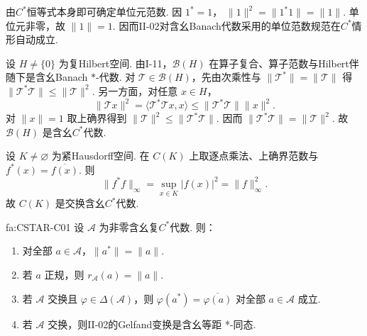 由\(\displaystyle C^*\)恒等式本身即可确定单位元范数. 因 \(\displaystyle1^*=1\)，
\(\displaystyle \|1\|^2=\|1^*1\|=\|1\|.\)
单位元非零，故 \(\displaystyle\|1\|=1\). 因而II-02对含幺Banach代数采用的单位范数规范在\(\displaystyle C^*\)情形自动成立.

\begin{FAExample}\label{ii03:bh-cstar}
设 \(\displaystyle H\neq\{0\}\) 为复Hilbert空间. 由I-11，\(\displaystyle\mathcal B(H)\) 在算子复合、算子范数与Hilbert伴随下是含幺Banach \(\displaystyle *\)-代数. 对 \(\displaystyle\mathcal T\in\mathcal B(H)\)，先由次乘性与 \(\displaystyle\|\mathcal T^*\|=\|\mathcal T\|\) 得
\(\displaystyle \|\mathcal T^*\mathcal T\|\leqslant\|\mathcal T\|^2.\)
另一方面，对任意 \(\displaystyle x\in H\)，
\[
\|\mathcal T x\|^2
=\langle\mathcal T^*\mathcal T x,x\rangle
\leqslant\|\mathcal T^*\mathcal T\|\|x\|^2.
\]
对 \(\displaystyle\|x\|=1\) 取上确界得到 \(\displaystyle\|\mathcal T\|^2\leqslant\|\mathcal T^*\mathcal T\|\). 因而
\(\displaystyle \|\mathcal T^*\mathcal T\|=\|\mathcal T\|^2.\)
故 \(\displaystyle\mathcal B(H)\) 是含幺\(\displaystyle C^*\)代数.
\end{FAExample}

\begin{FAExample}\label{ii03:ck-cstar}
设 \(\displaystyle K\neq\varnothing\) 为紧Hausdorff空间. 在 \(\displaystyle C(K)\) 上取逐点乘法、上确界范数与 \(\displaystyle f^*(x)=\overline{f(x)}\). 则
\[
\|f^*f\|_\infty
=\sup_{x\in K}|f(x)|^2
=\|f\|_\infty^2.
\]
故 \(\displaystyle C(K)\) 是交换含幺\(\displaystyle C^*\)代数.
\end{FAExample}

\begin{FAProposition}{fa:CSTAR-C01}
设 \(\displaystyle\mathcal A\) 为非零含幺复\(\displaystyle C^*\)代数. 则：
\begin{enumerate}[label=\textnormal{(\roman*)}]
\item 对全部 \(\displaystyle a\in\mathcal A\)，\(\displaystyle\|a^*\|=\|a\|\).
\item 若 \(\displaystyle a\) 正规，则 \(\displaystyle r_{\mathcal A}(a)=\|a\|\).
\item 若 \(\displaystyle\mathcal A\) 交换且 \(\displaystyle\varphi\in\Delta(\mathcal A)\)，则 \(\displaystyle\varphi(a^*)=\overline{\varphi(a)}\) 对全部 \(\displaystyle a\in\mathcal A\) 成立.
\item 若 \(\displaystyle\mathcal A\) 交换，则II-02的Gelfand变换是含幺等距 *-同态.
\end{enumerate}
\end{FAProposition}

